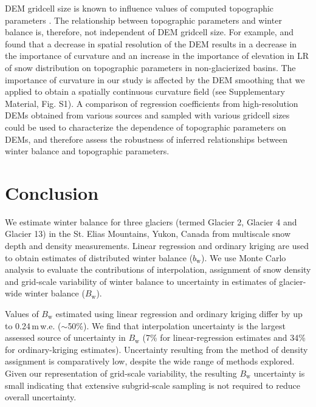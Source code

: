 \documentclass[review,oneside, letterpaper]{igs}
\begin{document}
DEM gridcell size is known to influence values of computed topographic parameters \citep{Zhang1994, Garbrecht1994, Guo-an2001, Lopez2010}. The relationship between topographic parameters and winter balance is, therefore, not independent of DEM gridcell size. For example, \cite{Kienzle2004} and \cite{Lopez2010} found that a decrease in spatial resolution of the DEM results in a decrease in the importance of curvature and an increase in the importance of elevation in LR of snow distribution on topographic parameters in non-glacierized basins. The importance of curvature in our study is affected by the DEM smoothing that we applied to obtain a spatially continuous curvature field (see Supplementary Material, Fig. S1). A comparison of regression coefficients from high-resolution DEMs obtained from various sources and sampled with various gridcell sizes could be used to characterize the dependence of topographic parameters on DEMs, and therefore assess the robustness of inferred relationships between winter balance and topographic parameters. 


\section{Conclusion}

We estimate winter balance for three glaciers (termed Glacier 2, Glacier 4 and Glacier 13) in the St. Elias Mountains, Yukon, Canada from multiscale snow depth and density measurements. Linear regression and ordinary kriging are used to obtain estimates of distributed winter balance ($b_\mathrm{w}$). We use Monte Carlo analysis to evaluate the contributions of interpolation, assignment of snow density and grid-scale variability of winter balance to uncertainty in estimates of glacier-wide winter balance ($B_\mathrm{w}$). 

Values of $B_\mathrm{w}$ estimated using linear regression and ordinary kriging differ by up to 0.24\,m\,w.e. ($\sim$50\%). We find that interpolation uncertainty is the largest assessed source of uncertainty in $B_\mathrm{w}$ (7\% for linear-regression estimates and 34\% for ordinary-kriging estimates). Uncertainty resulting from the method of density assignment is comparatively low, despite the wide range of methods explored. Given our representation of grid-scale variability, the resulting $B_\mathrm{w}$ uncertainty is small indicating that extensive subgrid-scale sampling is not required to reduce overall uncertainty. 
\end{document}
